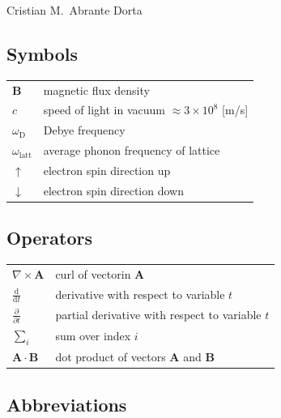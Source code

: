\documentclass[english, 12pt, a4paper, sci, utf8, a-1b, online]{aaltothesis}
\begin{document}
\vspace{5mm}
{\hfill Cristian M.\ Abrante Dorta \hspace{1cm}}

\newpage


\thesistableofcontents



\subsection*{Symbols}

\begin{tabular}{ll}
$\mathbf{B}$  & magnetic flux density  \\
$c$              & speed of light in vacuum $\approx 3\times10^8$ [m/s]\\
$\omega_{\mathrm{D}}$    & Debye frequency \\
$\omega_{\mathrm{latt}}$ & average phonon frequency of lattice \\
$\uparrow$       & electron spin direction up\\
$\downarrow$     & electron spin direction down
\end{tabular}

\subsection*{Operators}

\begin{tabular}{ll}
$\nabla \times \mathbf{A}$              & curl of vectorin $\mathbf{A}$\\
$\displaystyle\frac{\mbox{d}}{\mbox{d} t}$ & derivative with respect to 
variable $t$\\[3mm]
$\displaystyle\frac{\partial}{\partial t}$  & partial derivative with respect 
to variable $t$ \\[3mm]
$\sum_i $                       & sum over index $i$\\
$\mathbf{A} \cdot \mathbf{B}$    & dot product of vectors $\mathbf{A}$ and 
$\mathbf{B}$
\end{tabular}

\subsection*{Abbreviations}
\end{document}

